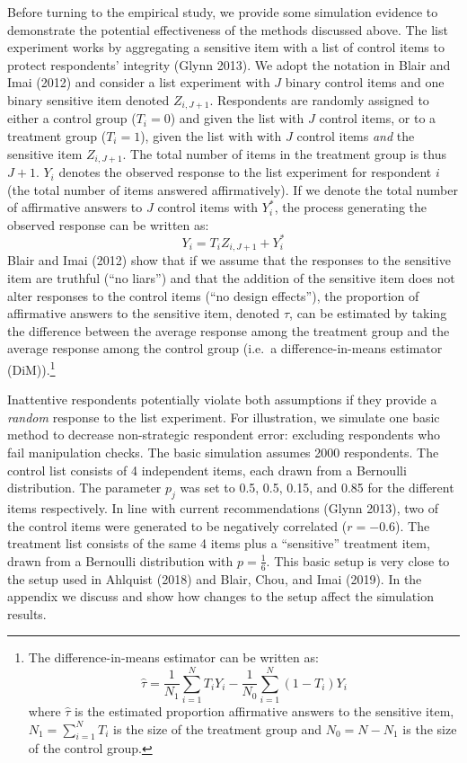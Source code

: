 \documentclass[]{article}
\let\rmarkdownfootnote\footnote%
\def\footnote{\protect\rmarkdownfootnote}
\begin{document}
Before turning to the empirical study, we provide some simulation
evidence to demonstrate the potential effectiveness of the methods
discussed above. The list experiment works by aggregating a sensitive
item with a list of control items to protect respondents' integrity
(Glynn 2013). We adopt the notation in Blair and Imai (2012) and
consider a list experiment with \(J\) binary control items and one
binary sensitive item denoted \(Z_{i, J+1}\). Respondents are randomly
assigned to either a control group (\(T_{i}=0\)) and given the list with
\(J\) control items, or to a treatment group (\(T_{i}=1\)), given the
list with with \(J\) control items \emph{and} the sensitive item
\(Z_{i, J+1}\). The total number of items in the treatment group is thus
\(J+1\). \(Y_{i}\) denotes the observed response to the list experiment
for respondent \(i\) (the total number of items answered affirmatively).
If we denote the total number of affirmative answers to \(J\) control
items with \(Y^*_{i}\), the process generating the observed response can
be written as: \[
Y_{i} = T_{i}Z_{i, J+1} + Y^*_{i}
\] Blair and Imai (2012) show that if we assume that the responses to
the sensitive item are truthful (``no liars'') and that the addition of
the sensitive item does not alter responses to the control items (``no
design effects''), the proportion of affirmative answers to the
sensitive item, denoted \(\tau\), can be estimated by taking the
difference between the average response among the treatment group and
the average response among the control group (i.e.~a difference-in-means
estimator (DiM)).\footnote{The difference-in-means estimator can be
  written as: \[
    \hat{\tau} = \frac{1}{N_{1}} \sum_{i=1}^{N}T_{i}Y_{i} - \frac{1}{N_{0}} \sum_{i=1}^{N}(1-T_{i})Y_{i}
    \] \noindent where \(\hat{\tau}\) is the estimated proportion
  affirmative answers to the sensitive item,
  \(N_{1} = \sum_{i=1}^{N}T_{i}\) is the size of the treatment group and
  \(N_{0}=N-N_{1}\) is the size of the control group.}

Inattentive respondents potentially violate both assumptions if they
provide a \emph{random} response to the list experiment. For
illustration, we simulate one basic method to decrease non-strategic
respondent error: excluding respondents who fail manipulation checks.
The basic simulation assumes 2000 respondents. The control list consists
of 4 independent items, each drawn from a Bernoulli distribution. The
parameter \(p_{j}\) was set to 0.5, 0.5, 0.15, and 0.85 for the
different items respectively. In line with current recommendations
(Glynn 2013), two of the control items were generated to be negatively
correlated (\(r=-0.6\)). The treatment list consists of the same 4 items
plus a ``sensitive'' treatment item, drawn from a Bernoulli distribution
with \(p=\frac{1}{6}\). This basic setup is very close to the setup used
in Ahlquist (2018) and Blair, Chou, and Imai (2019). In the appendix we
discuss and show how changes to the setup affect the simulation results.
\end{document}
